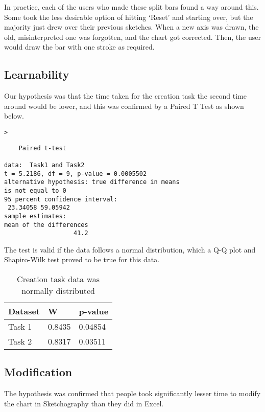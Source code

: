 In practice, each of the users who made these split bars found a way around this. Some took the less desirable option of hitting `Reset' and starting over, but the majority just drew over their previous sketches. When a new axis was drawn, the old, misinterpreted one was forgotten, and the chart got corrected. Then, the user would draw the bar with one stroke as required.

\subsection{Learnability}
Our hypothesis was that the time taken for the creation task the second time around would be lower, and this was confirmed by a Paired T Test as shown below.

\begin{alltt}
>   \hlstd{=} \hlstd{)}
\end{alltt}
\begin{verbatim} 
	Paired t-test

data:  Task1 and Task2
t = 5.2186, df = 9, p-value = 0.0005502
alternative hypothesis: true difference in means 
is not equal to 0
95 percent confidence interval:
 23.34058 59.05942
sample estimates:
mean of the differences 
                   41.2 
\end{verbatim}

The test is valid if the data follows a normal distribution, which a Q-Q plot and Shapiro-Wilk test proved to be true for this data.

\begin{table}[H]
\begin{center}
\setlength{\tabcolsep}{8pt} 
\renewcommand{\arraystretch}{1.5}


\begin{tabular}{l | l l}
Dataset & W & p-value \\ \hline
Task 1 & 0.8435 & 0.04854 \\
Task 2 & 0.8317 & 0.03511 \\
\end{tabular}
\end{center}
\caption{Creation task data was normally distributed}
\end{table}


\subsection{Modification}
The hypothesis was confirmed that people took significantly lesser time to modify the chart in Sketchography than they did in Excel.

